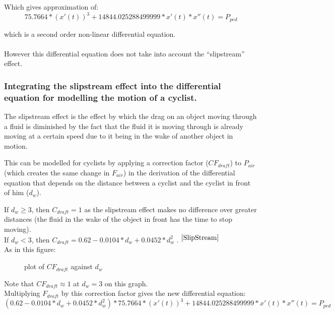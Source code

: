 \documentclass[10pt, a4paper]{report}
\begin{document}
Which gives approximation of:
$$ 75.7664 *(x'(t))^{3} + 14844.025288499999 * x'(t) * x''(t) = P_{ped}$$

which is a second order non-linear differential equation.\\\\

However this differential equation does not take into account the ``slipstream'' effect.

\subsubsection{Integrating the slipstream effect into the differential equation for modelling the motion of a cyclist.}

The slipstream effect is the effect by which the drag on an object moving through a fluid is diminished by the fact that the fluid it is moving through is already moving at a certain speed due to it being in the wake of another object in motion. \newline \par

This can be modelled for cyclists by applying a correction factor ($CF_{draft}$) to $P_{air}$ (which creates the same change in $F_{air}$) in the derivation of the differential equation that depends on the distance between a cyclist and the cyclist in front of him ($d_w$). \newline \par

If $d_w \ge 3$, then $C_{draft} = 1$ as the slipstream effect makes no difference over greater distances (the fluid in the wake of the object in front has the time to stop moving). \\
If $d_w < 3$, then $C_{draft} = 0.62 - 0.0104*d_w + 0.0452*d_w^2$ . $^{\cite{SlipStream}}$ \\
As in this figure:

\begin{figure}[!ht]
  \centering
    
  \caption{plot of $CF_{draft}$ against $d_w$}
\end{figure}

Note that $CF_{draft} \approx 1$ at $d_w = 3$ on this graph. \\

Multiplying $F_{draft}$ by this correction factor gives the new differential equation:
$$ (0.62 - 0.0104*d_w + 0.0452*d_w^2) * 75.7664 *(x'(t))^{3} + 14844.025288499999 * x'(t) * x''(t) = P_{ped}$$
\end{document}
